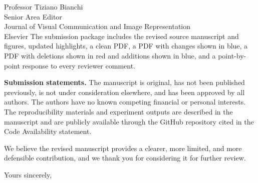 \documentclass[11pt,a4paper]{letter}
\begin{document}
\begin{letter}{Professor Tiziano Bianchi\\Senior Area Editor\\Journal of Visual Communication and Image Representation\\Elsevier}
The submission package includes the revised source manuscript and figures, updated highlights, a clean PDF, a PDF with changes shown in blue, a PDF with deletions shown in red and additions shown in blue, and a point-by-point response to every reviewer comment.

\textbf{Submission statements.} The manuscript is original, has not been published previously, is not under consideration elsewhere, and has been approved by all authors. The authors have no known competing financial or personal interests. The reproducibility materials and experiment outputs are described in the manuscript and are publicly available through the GitHub repository cited in the Code Availability statement.

We believe the revised manuscript provides a clearer, more limited, and more defensible contribution, and we thank you for considering it for further review.

\closing{Yours sincerely,}

\end{letter}
\end{document}
